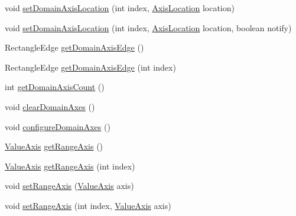 \begin{DoxyCompactItemize}
void \mbox{\hyperlink{classorg_1_1jfree_1_1chart_1_1plot_1_1_category_plot_a63be5f2040ea560e408c89c2e2dd7b3b}{set\+Domain\+Axis\+Location}} (int index, \mbox{\hyperlink{classorg_1_1jfree_1_1chart_1_1axis_1_1_axis_location}{Axis\+Location}} location)
\item 
void \mbox{\hyperlink{classorg_1_1jfree_1_1chart_1_1plot_1_1_category_plot_ae217c40729a549c9da9032bdf17d5654}{set\+Domain\+Axis\+Location}} (int index, \mbox{\hyperlink{classorg_1_1jfree_1_1chart_1_1axis_1_1_axis_location}{Axis\+Location}} location, boolean notify)
\item 
Rectangle\+Edge \mbox{\hyperlink{classorg_1_1jfree_1_1chart_1_1plot_1_1_category_plot_aaf7806f687975383113d09fe78908e4b}{get\+Domain\+Axis\+Edge}} ()
\item 
Rectangle\+Edge \mbox{\hyperlink{classorg_1_1jfree_1_1chart_1_1plot_1_1_category_plot_ac64df895789e69cf52a315b5f393a406}{get\+Domain\+Axis\+Edge}} (int index)
\item 
int \mbox{\hyperlink{classorg_1_1jfree_1_1chart_1_1plot_1_1_category_plot_a8356d96018473d13cd06b388d29a096a}{get\+Domain\+Axis\+Count}} ()
\item 
void \mbox{\hyperlink{classorg_1_1jfree_1_1chart_1_1plot_1_1_category_plot_a3207d2197dfdb65f4546f1daa280daa7}{clear\+Domain\+Axes}} ()
\item 
void \mbox{\hyperlink{classorg_1_1jfree_1_1chart_1_1plot_1_1_category_plot_aecdb1a8c70518fdf1402ef3ebdcd1fe3}{configure\+Domain\+Axes}} ()
\item 
\mbox{\hyperlink{classorg_1_1jfree_1_1chart_1_1axis_1_1_value_axis}{Value\+Axis}} \mbox{\hyperlink{classorg_1_1jfree_1_1chart_1_1plot_1_1_category_plot_a08c361dd63f47cfccbd61088009ee155}{get\+Range\+Axis}} ()
\item 
\mbox{\hyperlink{classorg_1_1jfree_1_1chart_1_1axis_1_1_value_axis}{Value\+Axis}} \mbox{\hyperlink{classorg_1_1jfree_1_1chart_1_1plot_1_1_category_plot_a2b2f8a011636e469d20c314698e1a98d}{get\+Range\+Axis}} (int index)
\item 
void \mbox{\hyperlink{classorg_1_1jfree_1_1chart_1_1plot_1_1_category_plot_a82087ffb92884b8ce553f430d2fb4ffd}{set\+Range\+Axis}} (\mbox{\hyperlink{classorg_1_1jfree_1_1chart_1_1axis_1_1_value_axis}{Value\+Axis}} axis)
\item 
void \mbox{\hyperlink{classorg_1_1jfree_1_1chart_1_1plot_1_1_category_plot_ab32de3218b4bc8a5d724b5e3129d43f3}{set\+Range\+Axis}} (int index, \mbox{\hyperlink{classorg_1_1jfree_1_1chart_1_1axis_1_1_value_axis}{Value\+Axis}} axis)
\item 

\end{DoxyCompactItemize}
